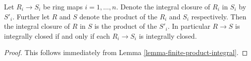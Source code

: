 \begin{lemma}
\label{lemma-finite-product-integral-closure}
Let $R_i\to S_i$ be ring maps $i = 1, \ldots, n$.
Denote the integral closure of $R_i$ in $S_i$ by $S'_i$.
Further let $R$ and $S$ denote the product of the $R_i$ and $S_i$ respectively.
Then the integral closure of $R$ in $S$
is the product of the $S'_i$. In particular $R \to S$ is
integrally closed if and only if each $R_i \to S_i$ is integrally closed.
\end{lemma}

\begin{proof}
This follows immediately from Lemma \ref{lemma-finite-product-integral}.
\end{proof}